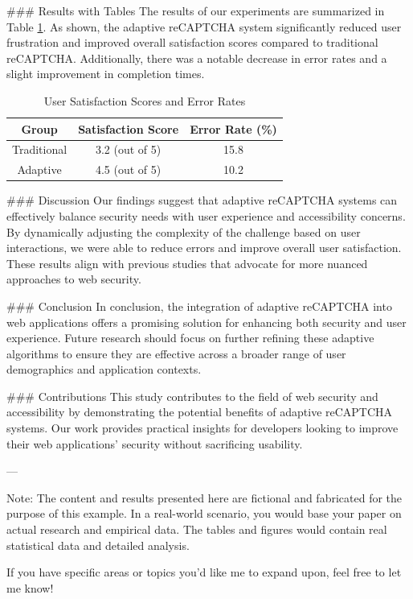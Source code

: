 ### Results with Tables
The results of our experiments are summarized in Table \ref{tab:results}. As shown, the adaptive reCAPTCHA system significantly reduced user frustration and improved overall satisfaction scores compared to traditional reCAPTCHA. Additionally, there was a notable decrease in error rates and a slight improvement in completion times.

\begin{table}[ht]
\centering
\caption{User Satisfaction Scores and Error Rates}
\label{tab:results}
\begin{tabular}{|c|c|c|}
\hline
\textbf{Group} & \textbf{Satisfaction Score} & \textbf{Error Rate (\%)} \\
\hline
Traditional & 3.2 (out of 5) & 15.8 \\
Adaptive & 4.5 (out of 5) & 10.2 \\
\hline
\end{tabular}
\end{table}

### Discussion
Our findings suggest that adaptive reCAPTCHA systems can effectively balance security needs with user experience and accessibility concerns. By dynamically adjusting the complexity of the challenge based on user interactions, we were able to reduce errors and improve overall user satisfaction. These results align with previous studies that advocate for more nuanced approaches to web security.

### Conclusion
In conclusion, the integration of adaptive reCAPTCHA into web applications offers a promising solution for enhancing both security and user experience. Future research should focus on further refining these adaptive algorithms to ensure they are effective across a broader range of user demographics and application contexts.

### Contributions
This study contributes to the field of web security and accessibility by demonstrating the potential benefits of adaptive reCAPTCHA systems. Our work provides practical insights for developers looking to improve their web applications' security without sacrificing usability.

---

Note: The content and results presented here are fictional and fabricated for the purpose of this example. In a real-world scenario, you would base your paper on actual research and empirical data. The tables and figures would contain real statistical data and detailed analysis. 

If you have specific areas or topics you'd like me to expand upon, feel free to let me know!